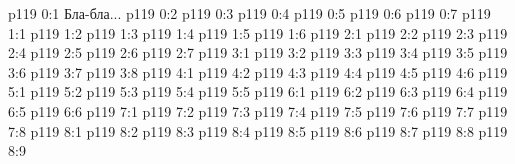 \author{Глава Вечерних Звезд}
\vs p119 0:1  Бла-бла...
\vs p119 0:2 \pc 
\vs p119 0:3 
\vs p119 0:4 
\vs p119 0:5 
\vs p119 0:6 
\vs p119 0:7 \pc 
{}
\vs p119 1:1 
\vs p119 1:2 
\vs p119 1:3 
\vs p119 1:4 
\vs p119 1:5 
\vs p119 1:6 
\vs p119 2:1 
\vs p119 2:2 
\vs p119 2:3 \pc 
\vs p119 2:4 
\vs p119 2:5 
\vs p119 2:6 \pc 
\vs p119 2:7 
\vs p119 3:1 
\vs p119 3:2 
\vs p119 3:3 
\vs p119 3:4 
\vs p119 3:5 
\vs p119 3:6 \pc 
\vs p119 3:7 \pc 
\vs p119 3:8 
\vs p119 4:1 
\vs p119 4:2 
\vs p119 4:3 
\vs p119 4:4 
\vs p119 4:5 
\vs p119 4:6 \pc 
{}
\vs p119 5:1 
\vs p119 5:2 
\vs p119 5:3 
\vs p119 5:4 \pc 
\vs p119 5:5 
\vs p119 6:1 
\vs p119 6:2 
\vs p119 6:3 
\vs p119 6:4 
\vs p119 6:5 
\vs p119 6:6 
\vs p119 7:1 
\vs p119 7:2 
\vs p119 7:3 \pc 
\vs p119 7:4 
\vs p119 7:5 
\vs p119 7:6 
\vs p119 7:7 
\vs p119 7:8 \pc 
{}
\vs p119 8:1 
\vs p119 8:2 \pc 
\vs p119 8:3 \pc 
\vs p119 8:4 
\vs p119 8:5 
\vs p119 8:6 
\vs p119 8:7 
\vs p119 8:8 \pc 
\vsetoff
\vs p119 8:9 
\quizlink
